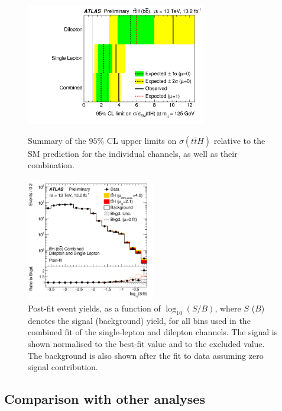 \begin{figure}[h!]
\centering
\includegraphics[width=0.7\textwidth]{figures/ttH/fig_14.png}
\captionsetup{width=0.85\textwidth}  \caption{\small Summary of the $95\%$ CL upper limits on $\sigma(t\bar{t}H)$ relative to the SM prediction for the individual channels, as well as their combination.}
\label{sec:ttH:fig:limitsum}

\centering
\includegraphics[width=0.5\textwidth]{figures/ttH/fig_12.png}
\captionsetup{width=0.85\textwidth}  \caption{\small Post-fit event yields, as a function of $\log_{10}(S/B)$, where $S$ ($B$) denotes the signal (background) yield, for all bins used in the
combined fit of the single-lepton and dilepton channels. The signal is shown normalised to the best-fit value and to the excluded value. The background is also shown after the fit to data assuming zero signal contribution.}
\label{sec:ttH:fig:sbbinssum}
\end{figure}

\subsection{Comparison with other analyses}


